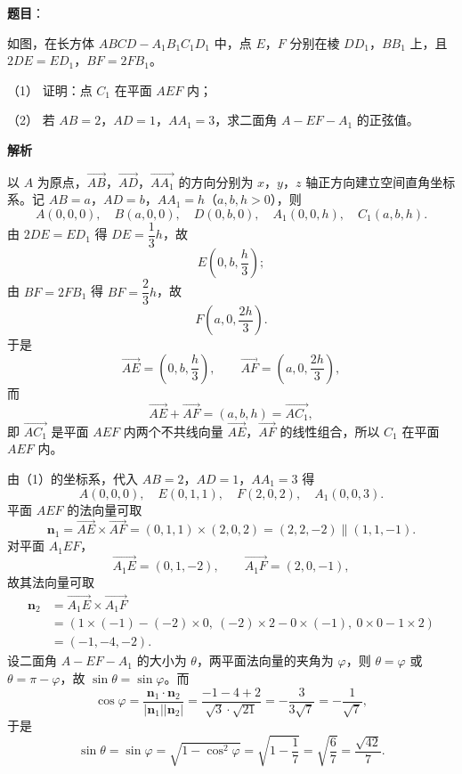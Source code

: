 \begin{answer}

\textbf{题目}：

如图，在长方体 $ABCD-A_1B_1C_1D_1$ 中，点 $E$，$F$ 分别在棱 $DD_1$，$BB_1$ 上，且 $2DE=ED_1$，$BF=2FB_1$。

（1） 证明：点 $C_1$ 在平面 $AEF$ 内；

（2） 若 $AB=2$，$AD=1$，$AA_1=3$，求二面角 $A-EF-A_1$ 的正弦值。
\nopagebreak[4]
\begin{center}\end{center}
\nopagebreak[4]
\textbf{解析}


以 $A$ 为原点，$\overrightarrow{AB}$，$\overrightarrow{AD}$，$\overrightarrow{AA_1}$ 的方向分别为 $x$，$y$，$z$ 轴正方向建立空间直角坐标系。记 $AB=a$，$AD=b$，$AA_1=h$（$a,b,h>0$），则
\nopagebreak[4]
\[A(0,0,0),\quad B(a,0,0),\quad D(0,b,0),\quad A_1(0,0,h),\quad C_1(a,b,h).\]
由 $2DE=ED_1$ 得 $DE=\dfrac13h$，故
\nopagebreak[4]
\[E\left(0,b,\frac h3\right);\]
由 $BF=2FB_1$ 得 $BF=\dfrac23h$，故
\nopagebreak[4]
\[F\left(a,0,\frac{2h}3\right).\]
于是
\nopagebreak[4]
\[\overrightarrow{AE}=\left(0,b,\frac h3\right),\qquad \overrightarrow{AF}=\left(a,0,\frac{2h}3\right),\]
而
\nopagebreak[4]
\[\overrightarrow{AE}+\overrightarrow{AF}=\left(a,b,h\right)=\overrightarrow{AC_1},\]
即 $\overrightarrow{AC_1}$ 是平面 $AEF$ 内两个不共线向量 $\overrightarrow{AE}$，$\overrightarrow{AF}$ 的线性组合，所以 $C_1$ 在平面 $AEF$ 内。


由（1）的坐标系，代入 $AB=2$，$AD=1$，$AA_1=3$ 得
\nopagebreak[4]
\[A(0,0,0),\quad E(0,1,1),\quad F(2,0,2),\quad A_1(0,0,3).\]
平面 $AEF$ 的法向量可取
\nopagebreak[4]
\[\boldsymbol n_1=\overrightarrow{AE}\times\overrightarrow{AF}=(0,1,1)\times(2,0,2)=(2,2,-2)\parallel(1,1,-1).\]
对平面 $A_1EF$，
\nopagebreak[4]
\[\overrightarrow{A_1E}=(0,1,-2),\qquad \overrightarrow{A_1F}=(2,0,-1),\]
故其法向量可取
\nopagebreak[4]
\[\begin{aligned}
\boldsymbol n_2&=\overrightarrow{A_1E}\times\overrightarrow{A_1F}\\
&=\left(1\times(-1)-(-2)\times0,\ (-2)\times2-0\times(-1),\ 0\times0-1\times2\right)\\
&=(-1,-4,-2).
\end{aligned}\]
设二面角 $A-EF-A_1$ 的大小为 $\theta$，两平面法向量的夹角为 $\varphi$，则 $\theta=\varphi$ 或 $\theta=\pi-\varphi$，故 $\sin\theta=\sin\varphi$。而
\nopagebreak[4]
\[\cos\varphi=\frac{\boldsymbol n_1\cdot\boldsymbol n_2}{|\boldsymbol n_1||\boldsymbol n_2|}=\frac{-1-4+2}{\sqrt3\cdot\sqrt{21}}=-\frac3{3\sqrt7}=-\frac1{\sqrt7},\]
于是
\nopagebreak[4]
\[\sin\theta=\sin\varphi=\sqrt{1-\cos^2\varphi}=\sqrt{1-\frac17}=\sqrt{\frac67}=\frac{\sqrt{42}}7 .\]


\end{answer}
